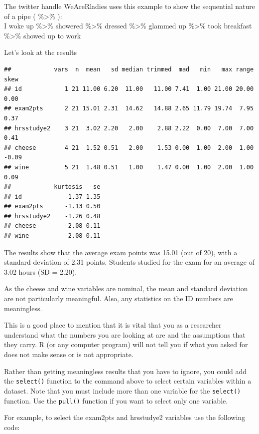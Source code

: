 \documentclass[
]{book}
\newenvironment{Shaded}{\begin{snugshade}}{\end{snugshade}}
\newcommand{\KeywordTok}[1]{\textcolor[rgb]{0.13,0.29,0.53}{\textbf{#1}}}
\newcommand{\NormalTok}[1]{#1}
\newcommand{\OperatorTok}[1]{\textcolor[rgb]{0.81,0.36,0.00}{\textbf{#1}}}
\newcommand{\StringTok}[1]{\textcolor[rgb]{0.31,0.60,0.02}{#1}}
\begin{document}
The twitter handle WeAreRladies uses this example to show the sequential nature of a pipe ( \%\textgreater\% ):\\
I woke up \%\textgreater\% showered \%\textgreater\% dressed \%\textgreater\% glammed up \%\textgreater\% took breakfast \%\textgreater\% showed up to work

Let's look at the results

\begin{verbatim}
##            vars  n  mean   sd median trimmed  mad   min   max range  skew
## id            1 21 11.00 6.20  11.00   11.00 7.41  1.00 21.00 20.00  0.00
## exam2pts      2 21 15.01 2.31  14.62   14.88 2.65 11.79 19.74  7.95  0.37
## hrsstudye2    3 21  3.02 2.20   2.00    2.88 2.22  0.00  7.00  7.00  0.41
## cheese        4 21  1.52 0.51   2.00    1.53 0.00  1.00  2.00  1.00 -0.09
## wine          5 21  1.48 0.51   1.00    1.47 0.00  1.00  2.00  1.00  0.09
##            kurtosis   se
## id            -1.37 1.35
## exam2pts      -1.13 0.50
## hrsstudye2    -1.26 0.48
## cheese        -2.08 0.11
## wine          -2.08 0.11
\end{verbatim}

The results show that the average exam points was 15.01 (out of 20), with a standard deviation of 2.31 points. Students studied for the exam for an average of 3.02 hours (SD = 2.20).

As the cheese and wine variables are nominal, the mean and standard deviation are not particularly meaningful. Also, any statistics on the ID numbers are meaningless.

This is a good place to mention that it is vital that you as a researcher understand what the numbers you are looking at are and the assumptions that they carry. R (or any computer program) will not tell you if what you asked for does not make sense or is not appropriate.

Rather than getting meaningless results that you have to ignore, you could add the \texttt{select()} function to the command above to select certain variables within a dataset. Note that you must include more than one variable for the \texttt{select()} function. Use the \texttt{pull()} function if you want to select only one variable.

For example, to select the exam2pts and hrsstudye2 variables use the following code:

\begin{Shaded}
\end{Shaded}
\end{document}
